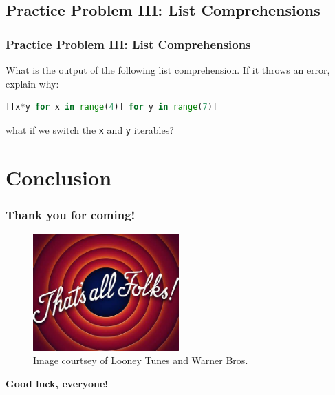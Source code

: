 \documentclass[hyperref={colorlinks,citecolor=blue,linkcolor=blue,urlcolor=blue}, aspectratio=1610]{beamer}
\begin{document}
\subsection{Practice Problem III: List Comprehensions}
\begin{frame}[fragile]
  \frametitle{Practice Problem III: List Comprehensions}
  What is the output of the following list comprehension. If it throws an error, explain why:
  \begin{lstlisting}[language=Python,style=mystyle]
    [[x*y for x in range(4)] for y in range(7)]
  \end{lstlisting}
  
  what if we switch the \texttt{x} and \texttt{y} iterables?

\end{frame}

\section{Conclusion}
\begin{frame}
  \frametitle{Thank you for coming!}
  \centering
  \begin{figure}
    \includegraphics[width=0.5\textwidth]{that's_all_folks.jpeg}
    \caption{Image courtsey of Looney Tunes\texttrademark{} and Warner Bros.\texttrademark{}}
  \end{figure}

  \textbf{Good luck, everyone!}
\end{frame}
\end{document}
